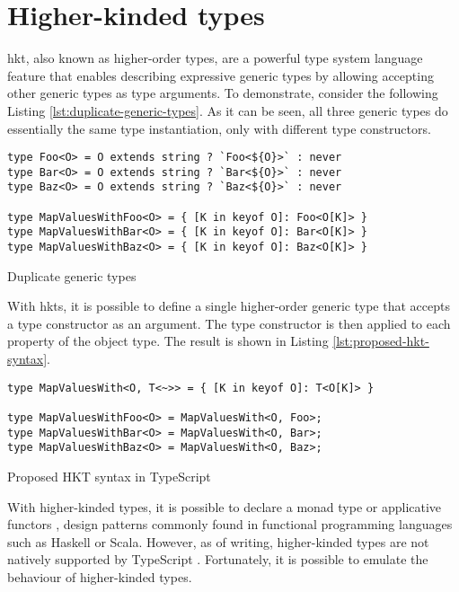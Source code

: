 \section{Higher-kinded types}\label{sec:higher-kinded-types}

\acrfull{hkt}, also known as higher-order types, are a powerful type system language feature that enables describing expressive generic types by allowing accepting other generic types as type arguments. To demonstrate, consider the following Listing \ref{lst:duplicate-generic-types}. As it can be seen, all three generic types do essentially the same type instantiation, only with different type constructors.

\begin{listing}[ht]
  \begin{verbatim}
type Foo<O> = O extends string ? `Foo<${O}>` : never
type Bar<O> = O extends string ? `Bar<${O}>` : never
type Baz<O> = O extends string ? `Baz<${O}>` : never

type MapValuesWithFoo<O> = { [K in keyof O]: Foo<O[K]> }
type MapValuesWithBar<O> = { [K in keyof O]: Bar<O[K]> }
type MapValuesWithBaz<O> = { [K in keyof O]: Baz<O[K]> }
\end{verbatim}
  \caption{Duplicate generic types}\label{lst:duplicate-generic-types}
\end{listing}

With \acrshort{hkt}s, it is possible to define a single higher-order generic type that accepts a type constructor as an argument. The type constructor is then applied to each property of the object type. The result is shown in Listing \ref{lst:proposed-hkt-syntax}.

\begin{listing}[ht]
  \begin{verbatim}
type MapValuesWith<O, T<~>> = { [K in keyof O]: T<O[K]> }

type MapValuesWithFoo<O> = MapValuesWith<O, Foo>;
type MapValuesWithBar<O> = MapValuesWith<O, Bar>;
type MapValuesWithBaz<O> = MapValuesWith<O, Baz>;
\end{verbatim}
  \caption{Proposed HKT syntax in TypeScript}\label{lst:proposed-hkt-syntax}
\end{listing}

With higher-kinded types, it is possible to declare a monad type \cite{wadlerMonadsFunctionalProgramming1993} or applicative functors \cite{mcbrideApplicativeProgrammingEffects2008}, design patterns commonly found in functional programming languages such as Haskell or Scala. However, as of writing, higher-kinded types are not natively supported by TypeScript \cite{DocumentationTypeScriptFunctional}. Fortunately, it is possible to emulate the behaviour of higher-kinded types.

